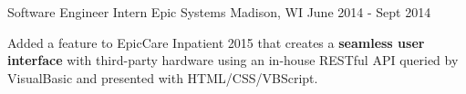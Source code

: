 \begin{cventries}
  \cventry
    {Software Engineer Intern} %
    {Epic Systems} %
    {Madison, WI} %
    {June 2014 - Sept 2014} %
    {
      \begin{cvitems} %
        \item {Added a feature to EpicCare Inpatient 2015 that creates a \textbf{seamless user interface} with third-party hardware using an in-house RESTful API queried by VisualBasic and presented with HTML/CSS/VBScript.}
      \end{cvitems}
    }

\end{cventries}
